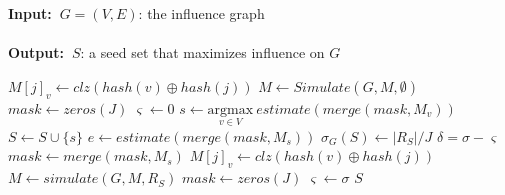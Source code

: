 \documentclass[10pt,journal,compsoc]{IEEEtran}
\renewcommand{\algorithmicrequire}{\textbf{Input:~}}
\renewcommand{\algorithmicensure}{\textbf{Output:~}}
\begin{document}
\begin{algorithm}
\caption{($G,K,J$)}
\label{algo:newgredy}
\algorithmicrequire{$G = (V,E)$: the influence graph
\\\\}
\algorithmicensure{$S$: a seed set that maximizes influence on $G$
}
\begin{algorithmic}[1]
            \State $M[j]_v \leftarrow clz(hash(v) \oplus hash(j))$ 
        \EndFor
    \EndFor
    \State $M \leftarrow Simulate(G,M,\emptyset)$
    \State $mask \leftarrow zeros(J)$
    \State $\varsigma \leftarrow 0$
        \State $s \leftarrow \underset{v\in V}{\mathrm{argmax}} ~estimate(merge(mask,M_v))$
        \State $S \leftarrow S \cup \{s\}$
        \State $e \leftarrow estimate(merge(mask,M_s))$
        \State $\sigma_G(S) \leftarrow |R_S|/J$
        \State $\delta = \sigma - \varsigma$
            \State $mask \leftarrow merge(mask,M_s)$
        \Else
                    \State $M[j]_v \leftarrow clz(hash(v) \oplus hash(j))$ 
                \EndFor
            \EndFor
            \State $M \leftarrow simulate(G,M,R_S)$
            \State $mask \leftarrow zeros(J) $ 
            \State $\varsigma \leftarrow \sigma $ 
        \EndIf
    \EndFor
    \State \Return $S$
\end{algorithmic}
\end{algorithm}
\end{document}
